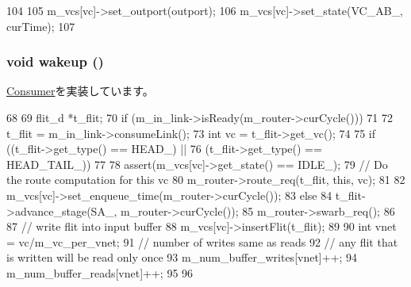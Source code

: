 \begin{DoxyCode}
104     {
105         m_vcs[vc]->set_outport(outport);
106         m_vcs[vc]->set_state(VC_AB_, curTime);
107     }
\end{DoxyCode}
\hypertarget{classInputUnit__d_ae674290a26ecbd622c5160e38e8a4fe9}{
\subsubsection[{wakeup}]{\setlength{\rightskip}{0pt plus 5cm}void wakeup ()}}
\label{classInputUnit__d_ae674290a26ecbd622c5160e38e8a4fe9}


\hyperlink{classConsumer_a623e3e7d1b1c725d70009f7b01a421b9}{Consumer}を実装しています。


\begin{DoxyCode}
68 {
69     flit_d *t_flit;
70     if (m_in_link->isReady(m_router->curCycle())) {
71 
72         t_flit = m_in_link->consumeLink();
73         int vc = t_flit->get_vc();
74 
75         if ((t_flit->get_type() == HEAD_) ||
76            (t_flit->get_type() == HEAD_TAIL_)) {
77 
78             assert(m_vcs[vc]->get_state() == IDLE_);
79             // Do the route computation for this vc
80             m_router->route_req(t_flit, this, vc);
81 
82             m_vcs[vc]->set_enqueue_time(m_router->curCycle());
83         } else {
84             t_flit->advance_stage(SA_, m_router->curCycle());
85             m_router->swarb_req();
86         }
87         // write flit into input buffer
88         m_vcs[vc]->insertFlit(t_flit);
89 
90         int vnet = vc/m_vc_per_vnet;
91         // number of writes same as reads
92         // any flit that is written will be read only once
93         m_num_buffer_writes[vnet]++;
94         m_num_buffer_reads[vnet]++;
95     }
96 }
\end{DoxyCode}


